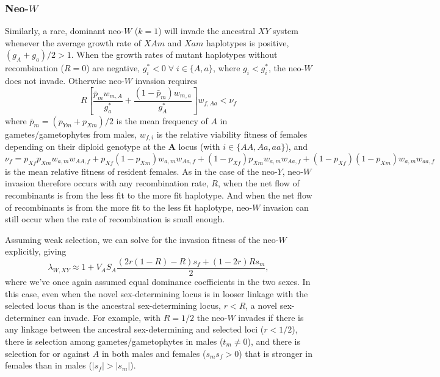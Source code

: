 \documentclass[12pt]{article}
\begin{document}
\subsubsection*{Neo-$W$}

Similarly, a rare, dominant neo-$W$ ($k=1$) will invade the ancestral $XY$ system whenever the average growth rate of $XAm$ and $Xam$ haplotypes is positive, $(g_A + g_a) / 2 > 1$. 
When the growth rates of mutant haplotypes without recombination ($R=0$) are negative, $g_i^* < 0 \; \forall \; i \in \{A,a\}$, where $g_i < g_i^*$, the neo-$W$ does not invade.
Otherwise neo-$W$ invasion requires
\begin{equation}
R \left[ \frac{\bar{p}_m w_{m,A}}{g_a^*} + \frac{(1 - \bar{p}_m) w_{m,a}}{g_A^*} \right] w_{f,Aa} < \nu_f
\end{equation}
where $\bar{p}_m = (p_{Ym}+p_{Xm}) / 2$ is the mean frequency of $A$ in gametes/gametophytes from males, $w_{f,i}$ is the relative viability fitness of females depending on their diploid genotype at the \textbf{A} locus (with $i\in\{AA,Aa,aa\}$), and 
$\nu_f = 
  p_{Xf} p_{Xm} w_{a,m} w_{AA,f} +
  p_{Xf} (1-p_{Xm}) w_{a,m} w_{Aa,f} +
  (1-p_{Xf}) p_{Xm} w_{a,m} w_{Aa,f} +
  (1-p_{Xf}) (1-p_{Xm}) w_{a, m} w_{aa,f}$
is the mean relative fitness of resident females. 
As in the case of the neo-$Y$, neo-$W$ invasion therefore occurs with any recombination rate, $R$, when the net flow of recombinants is from the less fit to the more fit haplotype.
And when the net flow of recombinants is from the more fit to the less fit  haplotype, neo-$W$ invasion can still occur when the rate of recombination is small enough.

Assuming weak selection, we can solve for the invasion fitness of the neo-$W$ explicitly, giving
\begin{equation}
\lambda_{W,XY} \approx 1 + V_A S_A \frac{(2r(1-R)-R) s_f + (1-2r)R s_m }{2},
\end{equation}
where we've once again assumed equal dominance coefficients in the two sexes.
In this case, even when the novel sex-determining locus is in looser linkage with the selected locus than is the ancestral sex-determining locus, $r<R$, a novel sex-determiner can invade.
For example, with $R=1/2$ the neo-$W$ invades if there is any linkage between the ancestral sex-determining and selected loci ($r<1/2$), there is selection among gametes/gametophytes in males ($t_m\neq0$), and there is selection for or against $A$ in both males and females ($s_m s_f >0$) that is stronger in females than in males ($|s_f| > |s_m|$).
\end{document}

